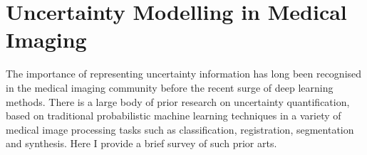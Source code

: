  
% 

 




%




\section{Uncertainty Modelling in Medical Imaging}
The importance of representing uncertainty information has long been recognised in the medical imaging community before the recent surge of deep learning methods. There is a large body of prior research on uncertainty quantification, based on traditional probabilistic machine learning techniques in a variety of medical image processing tasks such as classification, registration, segmentation and synthesis. Here I provide a brief survey of such prior arts. 
  
